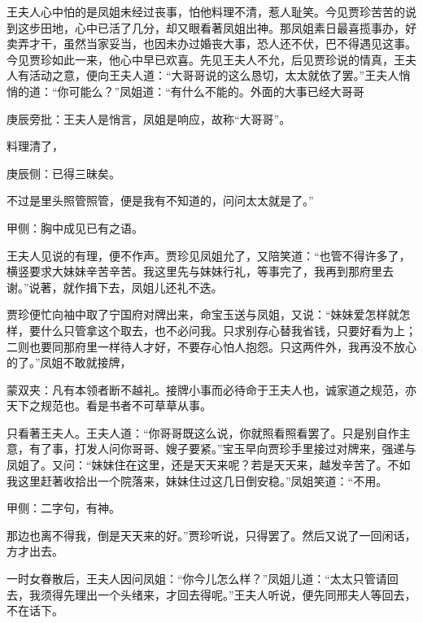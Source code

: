 \begin{parag}
    王夫人心中怕的是凤姐未经过丧事，怕他料理不清，惹人耻笑。今见贾珍苦苦的说到这步田地，心中已活了几分，却又眼看著凤姐出神。那凤姐素日最喜揽事办，好卖弄才干，虽然当家妥当，也因未办过婚丧大事，恐人还不伏，巴不得遇见这事。今见贾珍如此一来，他心中早已欢喜。先见王夫人不允，后见贾珍说的情真，王夫人有活动之意，便向王夫人道：“大哥哥说的这么恳切，太太就依了罢。”王夫人悄悄的道：“你可能么？”凤姐道：“有什么不能的。外面的大事已经大哥哥\begin{note}庚辰旁批：王夫人是悄言，凤姐是响应，故称“大哥哥”。\end{note}料理清了，\begin{note}庚辰侧：已得三昧矣。\end{note}不过是里头照管照管，便是我有不知道的，问问太太就是了。”\begin{note}甲侧：胸中成见已有之语。\end{note}王夫人见说的有理，便不作声。贾珍见凤姐允了，又陪笑道：“也管不得许多了，横竖要求大妹妹辛苦辛苦。我这里先与妹妹行礼，等事完了，我再到那府里去谢。”说著，就作揖下去，凤姐儿还礼不迭。
\end{parag}


\begin{parag}
    贾珍便忙向袖中取了宁国府对牌出来，命宝玉送与凤姐，又说：“妹妹爱怎样就怎样，要什么只管拿这个取去，也不必问我。只求别存心替我省钱，只要好看为上；二则也要同那府里一样待人才好，不要存心怕人抱怨。只这两件外，我再没不放心的了。”凤姐不敢就接牌，\begin{note}蒙双夹：凡有本领者断不越礼。接牌小事而必待命于王夫人也，诚家道之规范，亦天下之规范也。看是书者不可草草从事。\end{note}只看著王夫人。王夫人道：“你哥哥既这么说，你就照看照看罢了。只是别自作主意，有了事，打发人问你哥哥、嫂子要紧。”宝玉早向贾珍手里接过对牌来，强递与凤姐了。又问：“妹妹住在这里，还是天天来呢？若是天天来，越发辛苦了。不如我这里赶著收拾出一个院落来，妹妹住过这几日倒安稳。”凤姐笑道：“不用。\begin{note}甲侧：二字句，有神。\end{note}那边也离不得我，倒是天天来的好。”贾珍听说，只得罢了。然后又说了一回闲话，方才出去。
\end{parag}


\begin{parag}
    一时女眷散后，王夫人因问凤姐：“你今儿怎么样？”凤姐儿道：“太太只管请回去，我须得先理出一个头绪来，才回去得呢。”王夫人听说，便先同邢夫人等回去，不在话下。
\end{parag}


